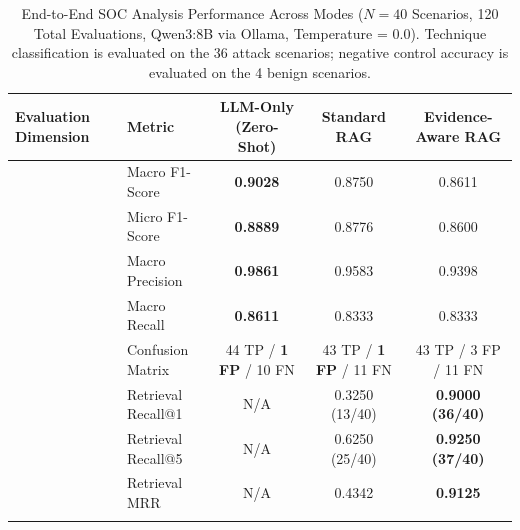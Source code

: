 
\begin{table}[t]
\centering
\small
\caption{End-to-End SOC Analysis Performance Across Modes ($N = 40$ Scenarios, 120 Total Evaluations, Qwen3:8B via Ollama, Temperature = 0.0). Technique classification is evaluated on the 36 attack scenarios; negative control accuracy is evaluated on the 4 benign scenarios.}
\label{tab:pipeline_performance}
\begin{tabular}{llccc}
\toprule
\textbf{Evaluation Dimension} & \textbf{Metric} & \textbf{LLM-Only (Zero-Shot)} & \textbf{Standard RAG} & \textbf{Evidence-Aware RAG} \\
\midrule
{} 
    & Macro F1-Score & \textbf{0.9028} & 0.8750 & 0.8611 \\
    & Micro F1-Score & \textbf{0.8889} & 0.8776 & 0.8600 \\
    & Macro Precision & \textbf{0.9861} & 0.9583 & 0.9398 \\
    & Macro Recall & \textbf{0.8611} & 0.8333 & 0.8333 \\
    & Confusion Matrix & 44 TP / \textbf{1 FP} / 10 FN & 43 TP / \textbf{1 FP} / 11 FN & 43 TP / 3 FP / 11 FN \\
\midrule
{}
    & Retrieval Recall@1 & N/A & 0.3250 (13/40) & \textbf{0.9000 (36/40)} \\
    & Retrieval Recall@5 & N/A & 0.6250 (25/40) & \textbf{0.9250 (37/40)} \\
    & Retrieval MRR & N/A & 0.4342 & \textbf{0.9125} \\
\midrule
{}

\end{tabular}
\end{table}
